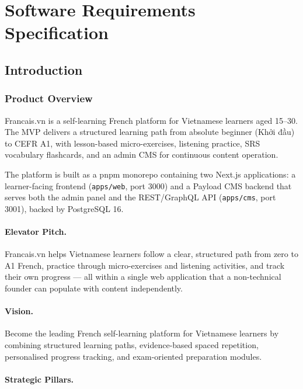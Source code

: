 \section{Software Requirements Specification}

\subsection{Introduction}

\subsubsection{Product Overview}

Francais.vn is a self-learning French platform for Vietnamese learners aged 15--30. The MVP delivers a structured learning path from absolute beginner (Khởi đầu) to CEFR A1, with lesson-based micro-exercises, listening practice, SRS vocabulary flashcards, and an admin CMS for continuous content operation.

The platform is built as a pnpm monorepo containing two Next.js applications: a learner-facing frontend (\texttt{apps/web}, port 3000) and a Payload CMS backend that serves both the admin panel and the REST/GraphQL API (\texttt{apps/cms}, port 3001), backed by PostgreSQL 16.

\paragraph{Elevator Pitch.}
Francais.vn helps Vietnamese learners follow a clear, structured path from zero to A1 French, practice through micro-exercises and listening activities, and track their own progress — all within a single web application that a non-technical founder can populate with content independently.

\paragraph{Vision.}
Become the leading French self-learning platform for Vietnamese learners by combining structured learning paths, evidence-based spaced repetition, personalised progress tracking, and exam-oriented preparation modules.

\paragraph{Strategic Pillars.}

